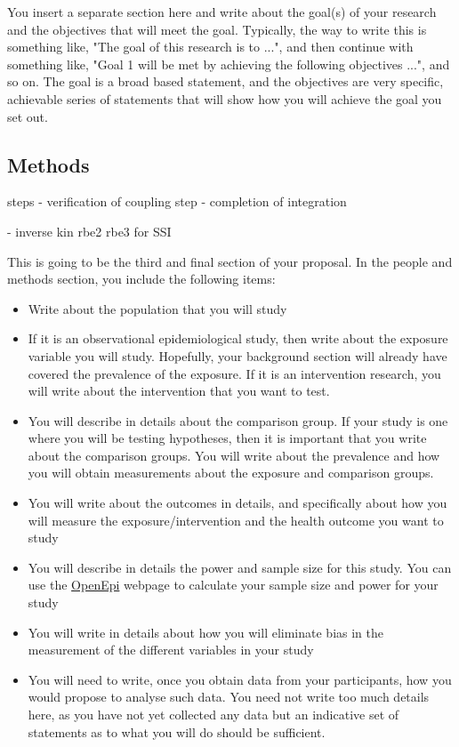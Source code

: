 \documentclass[a4paper]{article}
\begin{document}









You insert a separate section here and write about the goal(s) of your research and the objectives that will meet the goal. Typically, the way to write this is something like, "The goal of this research is to ...", and then continue with something like, "Goal 1 will be met by achieving the following objectives ...", and so on. The goal is a broad based statement, and the objectives are very specific, achievable series of statements that will show how you will achieve the goal you set out. 




\subsection*{Methods}


steps
- verification of coupling step
- completion of integration


- inverse kin rbe2 rbe3 for SSI





This is going to be the third and final section of your proposal. In the people and methods section, you include the following items:

\begin{itemize}
\item Write about the population that you will study
\item If it is an observational epidemiological study, then write about the exposure variable you will study. Hopefully, your background section will already have covered the prevalence of the exposure. If it is an intervention research, you will write about the intervention that you want to test.
\item You will describe in details about the comparison group. If your study is one where you will be testing hypotheses, then it is important that you write about the comparison groups. You will write about the prevalence and how you will obtain measurements about the exposure and comparison groups.
\item You will write about the outcomes in details, and specifically about how you will measure the exposure/intervention and the health outcome you want to study
\item You will describe in details the power and sample size for this study. You can use the \href{http://www.openepi.com/Menu/OE_Menu.htm}{OpenEpi} webpage to calculate your sample size and power for your study
\item You will write in details about how you will eliminate bias in the measurement of the different variables in your study
\item You will need to write, once you obtain data from your participants, how you would propose to analyse such data. You need not write too much details here, as you have not yet collected any data but an indicative set of statements as to what you will do should be sufficient. 
\end{itemize}
\end{document}
